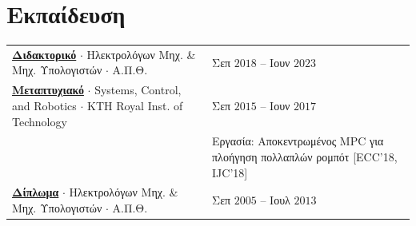 \documentclass[a4paper,10pt,twoside]{article}
\begin{document}
\section{\textbf{Εκπαίδευση}}%
\vspace{-1em}
\begin{center}
\begin{tabular}{ll}
  \href{https://www.didaktorika.gr/eadd/handle/10442/56399?locale=el}{\textbf{Διδακτορικό}} $\cdot$ Ηλεκτρολόγων Μηχ. \& Μηχ. Υπολογιστών $\cdot$ Α.Π.Θ. & {\small \textcolor{agray}{Σεπ $2018$ -- Ιουν $2023$}} \\
  \href{http://kth.diva-portal.org/smash/record.jsf?pid=diva2\%3A1102597\&dswid=2875}{\textbf{Μεταπτυχιακό}} $\cdot$ Systems, Control, and Robotics $\cdot$ KTH Royal Inst. of Technology & {\small \textcolor{agray}{Σεπ $2015$ -- Ιουν $2017$}} \\
  & \hspace{-30.3em} Εργασία: Αποκεντρωμένος MPC για πλοήγηση πολλαπλών ρομπότ [ECC'18, IJC'18] \\
  \href{https://ikee.lib.auth.gr/record/291560}{\textbf{Δίπλωμα}} $\cdot$ Ηλεκτρολόγων Μηχ. \& Μηχ. Υπολογιστών $\cdot$ Α.Π.Θ. & {\small \textcolor{agray}{Σεπ $2005$ -- Ιουλ $2013$}}
\end{tabular}
\end{center}
\end{document}
